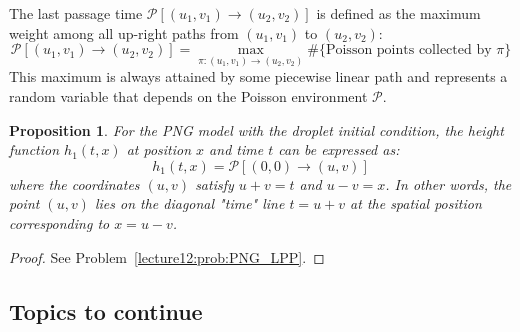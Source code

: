 \documentclass[letterpaper,11pt,oneside,reqno]{book}
\numberwithin{equation}{chapter}  %
\newtheorem{proposition}{Proposition}[chapter]  %
\theoremstyle{definition}
\begin{document}
The last passage time $\mathcal{P}[(u_1, v_1) \to (u_2, v_2)]$ is defined as the maximum weight among all up-right paths from $(u_1, v_1)$ to $(u_2, v_2)$:
\begin{equation*}
\mathcal{P}[(u_1, v_1) \to (u_2, v_2)] = \max_{\pi: (u_1, v_1) \to (u_2, v_2)} \#\{\text{Poisson points collected by }\pi\}
\end{equation*}
This maximum is always attained by some piecewise linear path and represents a random variable that depends on the Poisson environment $\mathcal{P}$.

\begin{proposition}
	\label{lecture12:prop:PNG}
For the PNG model with the droplet initial condition, the height function $h_1(t,x)$ at position $x$ and time $t$ can be expressed as:
\begin{equation*}
h_1(t,x) = \mathcal{P}[(0,0) \to (u,v)]
\end{equation*}
where the coordinates $(u,v)$ satisfy $u + v = t$ and $u - v = x$. In other words, the point $(u,v)$ lies on the diagonal "time" line $t = u + v$ at the spatial position corresponding to $x = u - v$.
\end{proposition}
\begin{proof}
	See Problem~\ref{lecture12:prob:PNG_LPP}.
\end{proof}

\subsection{Topics to continue}
\end{document}
